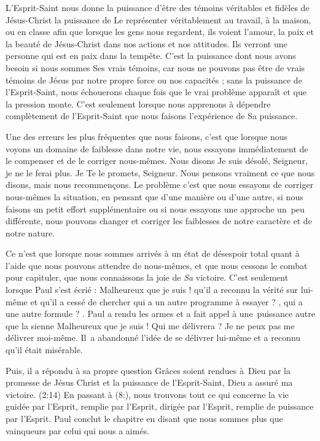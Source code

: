 L'Esprit-Saint nous donne la puissance d'être des témoins véritables
 et fidèles de Jésus-Christ \ocadr la puissance de Le représenter
 véritablement au travail, à la maison, ou en classe \fcadr{}
 afin que lorsque les gens nous regardent, ils voient l'amour,
 la paix et la beauté de Jésus-Christ dans nos actions et nos attitudes.
 Ils verront une personne qui est en paix dans la tempête.
 C'est la puissance dont nous avons besoin si nous sommes Ses vrais témoins,
 car nous ne pouvons pas être de vrais témoins de Jésus par notre propre force
 ou nos capacités ; sans la puissance de l'Esprit-Saint, nous échouerons
 chaque fois que le vrai problème apparaît et que la pression monte.
 C'est seulement lorsque nous apprenons à dépendre complètement
 de l'Esprit-Saint que nous faisons l'expérience de Sa puissance.

Une des erreurs les plus fréquentes que nous faisons, c'est que lorsque nous voyons un domaine de
 faiblesse dans notre vie, nous essayons immédiatement de le compenser
 et de le corriger nous-mêmes. Nous disons\frcolon{}
 \Og Je suis désolé, Seigneur, je ne le ferai plus.
 Je Te le promets, Seigneur. \Fg{}
 Nous pensons vraiment ce que nous disons, mais nous recommençons.
 Le problème c'est que nous essayons de corriger nous-mêmes la situation,
 en pensant que d'une manière ou d'une autre, si nous faisons un petit effort
 supplémentaire ou si nous essayons une approche un~peu différente,
 nous pouvons changer et corriger les faiblesses de notre caractère
 et de notre nature.

Ce n'est que lorsque nous sommes arrivés à un état de désespoir total
 quant à l'aide que nous pouvons attendre de nous-mêmes, et que nous cessons le combat
 pour capituler, que nous connaissons la joie de \emph{Sa} victoire.
 C'est seulement lorsque Paul s'est écrié :
 \Og Malheureux que je suis ! \Fg{} qu'il a reconnu la vérité sur lui-même
 et qu'il a cessé de chercher \Og qui a un autre programme à essayer ? \Fg{},
 \Og qui a une autre formule ? \Fg{}.
 Paul a rendu les armes et a fait appel à une~puissance
 autre que la sienne\frcolon{} \Og Malheureux que je suis ! Qui me délivrera ?
 Je ne peux pas me délivrer moi-même. \Fg{}
 Il~a abandonné l'idée de se délivrer lui-même et a reconnu
 qu'il était misérable.

Puis, il a répondu à sa propre question\frcolon{}
 \Og Grâces soient rendues à~Dieu par la promesse de Jésus Christ
 et la puissance de l'Esprit-Saint, Dieu a assuré ma victoire. \Fg{}
 (2:14) En passant à (8:),
 nous trouvons tout ce qui concerne la vie guidée par l'Esprit,
 remplie par l'Esprit, dirigée par l'Esprit, remplie de puissance par l'Esprit.
 Paul conclut le chapitre en disant que nous sommes \Og plus que vainqueurs
 par celui qui nous a aimés. \Fg{}

